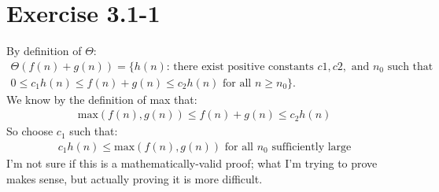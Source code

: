 \documentclass{article}
\begin{document}
\section*{Exercise 3.1-1}

By definition of $\Theta$:
\begin{eqnarray*}
	\Theta(f(n) + g(n)) = \{h(n) \text{: there exist positive constants } c1, c2, \text{ and } n_0 \text{ such that } \\
	0 \leq c_1 h(n) \leq f(n) + g(n) \leq c_2 h(n) \text{ for all } n \geq n_0\}.
\end{eqnarray*}
We know by the definition of max that:
\begin{eqnarray*}
	\text{max}(f(n), g(n)) \leq f(n) + g(n) \leq c_2 h(n)
\end{eqnarray*}
So choose $c_1$ such that:
\begin{eqnarray*}
	c_1 h(n) \leq \text{max}(f(n),g(n)) \text{ for all } n_0 \text{ sufficiently large}
\end{eqnarray*}
I'm not sure if this is a mathematically-valid proof; what I'm trying to prove makes sense, but actually proving it is more difficult.
\end{document}
